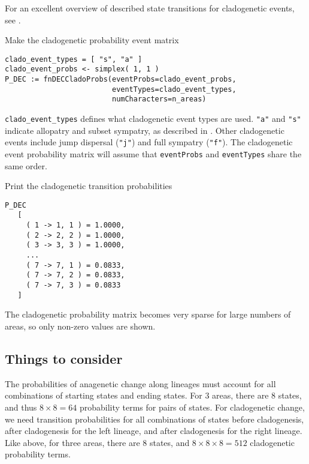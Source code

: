 For an excellent overview of described state transitions for cladogenetic events, see \citet{Matzke2012}.

Make the cladogenetic probability event matrix

\begin{snugshade}
\begin{lstlisting}
clado_event_types = [ "s", "a" ]
clado_event_probs <- simplex( 1, 1 )
P_DEC := fnDECCladoProbs(eventProbs=clado_event_probs,
                         eventTypes=clado_event_types,
                         numCharacters=n_areas)
\end{lstlisting}
\end{snugshade}

{\tt clado\_event\_types} defines what cladogenetic event types are used.
{\tt "a"} and {\tt "s"} indicate allopatry and subset sympatry, as described in \citep{ree05}.
Other cladogenetic events include jump dispersal ({\tt "j"}) and full sympatry ({\tt "f"}).
The cladogenetic event probability matrix will assume that {\tt eventProbs} and {\tt eventTypes} share the same order.

Print the cladogenetic transition probabilities

\begin{snugshade}
\begin{lstlisting}
P_DEC
   [
     ( 1 -> 1, 1 ) = 1.0000,
     ( 2 -> 2, 2 ) = 1.0000,
     ( 3 -> 3, 3 ) = 1.0000,
     ...
     ( 7 -> 7, 1 ) = 0.0833,
     ( 7 -> 7, 2 ) = 0.0833,
     ( 7 -> 7, 3 ) = 0.0833
   ]
\end{lstlisting}
\end{snugshade}

The cladogenetic probability matrix becomes very sparse for large numbers of areas, so only non-zero values are shown.

\subsection{Things to consider}

The probabilities of anagenetic change along lineages must account for all combinations of starting states and ending states.
For 3 areas, there are 8 states, and thus $8 \times 8 = 64$ probability terms for pairs of states.
For cladogenetic change, we need transition probabilities for all combinations of states before cladogenesis, after cladogenesis for the left lineage, and after cladogenesis for the right lineage.
Like above, for three areas, there are 8 states, and $8 \times 8 \times 8 = 512$ cladogenetic probability terms.

